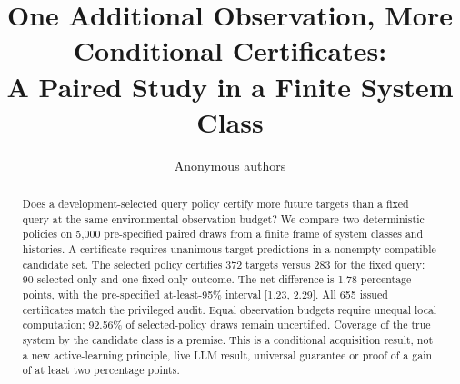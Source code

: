 \documentclass[10pt]{article}
\title{One Additional Observation, More Conditional Certificates:\\A Paired Study in a Finite System Class}
\author{Anonymous authors}
\begin{document}
\raggedbottom\maketitle
\begingroup\renewcommand{\thefootnote}{}\endgroup
\begin{abstract}
Does a development-selected query policy certify more future targets than a
fixed query at the same environmental observation budget? We compare two
deterministic policies on 5,000 pre-specified paired draws from a finite frame
of system classes and histories. A certificate requires unanimous target
predictions in a nonempty compatible candidate set. The selected policy
certifies 372 targets versus 283 for the fixed query: 90 selected-only and
one fixed-only outcome. The net difference is 1.78 percentage points, with
the pre-specified at-least-95\% interval [1.23, 2.29]. All 655 issued certificates
match the privileged audit. Equal observation budgets require unequal local
computation; 92.56\% of selected-policy draws remain uncertified. Coverage of
the true system by the candidate class is a premise. This is a conditional
acquisition result, not a new active-learning principle, live LLM result,
universal guarantee or proof of a gain of at least two percentage points.
\end{abstract}


\appendix
\end{document}
